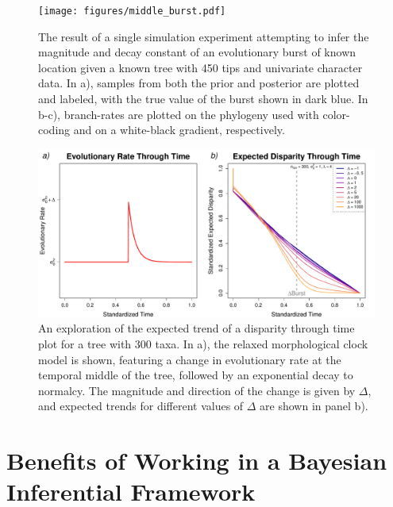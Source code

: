 \begin{figure}[h]
\centering
\texttt{[image: figures/middle\_burst.pdf]}
\caption[Posterior Distribution of a Middle Burst Brownian Motion Model]{The result of a single simulation experiment attempting to infer the magnitude and decay constant of an evolutionary burst of known location given a known tree with 450 tips and univariate character data. In a), samples from both the prior and posterior are plotted and labeled, with the true value of the burst shown in dark blue. In b-c), branch-rates are plotted on the phylogeny used with color-coding and on a white-black gradient, respectively. 
\label{fig:middleBurst}
\label{overflow}}
\end{figure} 

\begin{figure}[h]
\centering
\includegraphics[width=160mm]{figures/expected_disparity_through_time.pdf}
\caption[Variation in Expected Disparity Through Time Under Varying Middle Bursts]{An exploration of the expected trend of a disparity through time plot for a tree with 300 taxa. In a), the relaxed morphological clock model is shown, featuring a change in evolutionary rate at the temporal middle of the tree, followed by an exponential decay to normalcy. The magnitude and direction of the change is given by $\Delta$, and expected trends for different values of $\Delta$ are shown in panel b). 
\label{overflow}
\label{fig:disparityThroughTime}}
\end{figure} 
  

\clearpage

\section{Benefits of Working in a Bayesian Inferential Framework}


